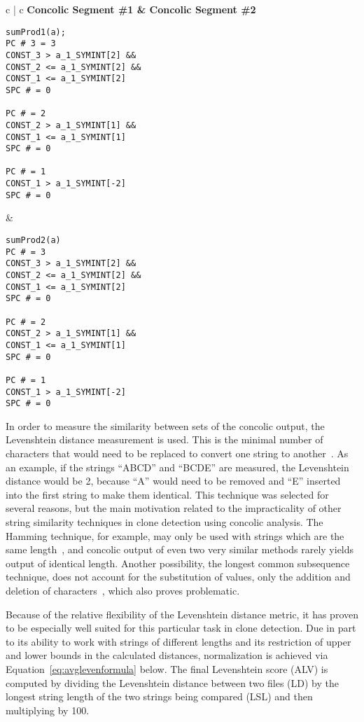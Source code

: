 \documentclass[smallextended]{svjour3}       %
\begin{document}
\noindent
\begin{table*}
\centering
\begin{tabular}{c | c}
\bfseries Concolic Segment \#1  & \bfseries Concolic Segment \#2 \\ \hline \hline
\begin{lstlisting}
sumProd1(a);
PC # 3 = 3
CONST_3 > a_1_SYMINT[2] &&
CONST_2 <= a_1_SYMINT[2] &&
CONST_1 <= a_1_SYMINT[2]
SPC # = 0

PC # = 2
CONST_2 > a_1_SYMINT[1] &&
CONST_1 <= a_1_SYMINT[1]
SPC # = 0

PC # = 1
CONST_1 > a_1_SYMINT[-2]
SPC # = 0
\end{lstlisting}
&
\begin{lstlisting}
sumProd2(a)
PC # = 3
CONST_3 > a_1_SYMINT[2] &&
CONST_2 <= a_1_SYMINT[2] &&
CONST_1 <= a_1_SYMINT[2]
SPC # = 0

PC # = 2
CONST_2 > a_1_SYMINT[1] &&
CONST_1 <= a_1_SYMINT[1]
SPC # = 0

PC # = 1
CONST_1 > a_1_SYMINT[-2]
SPC # = 0
\end{lstlisting}

\end{tabular}
\caption{Diff of Concolic Output~\label{table:concolicoutputcomparision}}
\end{table*}


In order to measure the similarity between sets of the concolic output, the Levenshtein distance measurement is used. This is the minimal number of characters that would need to be replaced to convert one string to another~\cite{Bard:2007:STO:1274531.1274545,Greenhill:2011:LDF:2077692.2077695}. As an example, if the strings ``ABCD'' and ``BCDE'' are measured, the Levenshtein distance would be 2, because ``A'' would need to be removed and ``E'' inserted into the first string to make them identical. This technique was selected for several reasons, but the main motivation related to the impracticality of other string similarity techniques in clone detection using concolic analysis. The Hamming technique, for example, may only be used with strings which are the same length~\cite{Ros:2005:PRR:1086297.1086311, Jain:2012:HES:2324796.2324820}, and concolic output of even two very similar methods rarely yields output of identical length. Another possibility, the longest common subsequence technique, does not account for the substitution of values, only the addition and deletion of characters~\cite{Li:2008:SEA:1593105.1593164}, which also proves problematic.

Because of the relative flexibility of the Levenshtein distance metric, it has proven to be especially well suited for this particular task in clone detection. Due in part to its ability to work with strings of different lengths and its restriction of upper and lower bounds in the calculated distances, normalization is achieved via Equation~\ref{eq:avglevenformula} below. The final Levenshtein score (ALV) is computed by dividing the Levenshtein distance between two files (LD) by the longest string length of the two strings being compared (LSL) and then multiplying by 100.
\end{document}
